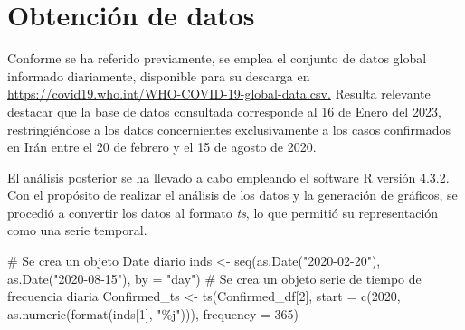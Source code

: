\documentclass[
  letterpaper,
  DIV=11,
  numbers=noendperiod]{scrreport}
\newenvironment{Shaded}{\begin{snugshade}}{\end{snugshade}}
\newcommand{\AttributeTok}[1]{\textcolor[rgb]{0.40,0.45,0.13}{#1}}
\newcommand{\CommentTok}[1]{\textcolor[rgb]{0.37,0.37,0.37}{#1}}
\newcommand{\DecValTok}[1]{\textcolor[rgb]{0.68,0.00,0.00}{#1}}
\newcommand{\FunctionTok}[1]{\textcolor[rgb]{0.28,0.35,0.67}{#1}}
\newcommand{\NormalTok}[1]{\textcolor[rgb]{0.00,0.23,0.31}{#1}}
\newcommand{\OtherTok}[1]{\textcolor[rgb]{0.00,0.23,0.31}{#1}}
\newcommand{\StringTok}[1]{\textcolor[rgb]{0.13,0.47,0.30}{#1}}
\theoremstyle{plain}
\theoremstyle{definition}
\theoremstyle{definition}
\theoremstyle{plain}
\theoremstyle{remark}
\begin{document}
\section{Obtención de datos}\label{obtenciuxf3n-de-datos}

Conforme se ha referido previamente, se emplea el conjunto de datos
global informado diariamente, disponible para su descarga en
\url{https://covid19.who.int/WHO-COVID-19-global-data.csv.} Resulta
relevante destacar que la base de datos consultada corresponde al 16 de
Enero del 2023, restringiéndose a los datos concernientes exclusivamente
a los casos confirmados en Irán entre el 20 de febrero y el 15 de agosto
de 2020.

El análisis posterior se ha llevado a cabo empleando el software R
versión 4.3.2. Con el propósito de realizar el análisis de los datos y
la generación de gráficos, se procedió a convertir los datos al formato
\emph{ts}, lo que permitió su representación como una serie temporal.

\begin{Shaded}
\begin{Highlighting}[]
\CommentTok{\# Se crea un objeto \textquotesingle{}Date\textquotesingle{} diario}
\NormalTok{inds }\OtherTok{\textless{}{-}} \FunctionTok{seq}\NormalTok{(}\FunctionTok{as.Date}\NormalTok{(}\StringTok{"2020{-}02{-}20"}\NormalTok{), }\FunctionTok{as.Date}\NormalTok{(}\StringTok{"2020{-}08{-}15"}\NormalTok{), }\AttributeTok{by =} \StringTok{"day"}\NormalTok{)}
\CommentTok{\# Se crea un objeto \textquotesingle{}serie de tiempo\textquotesingle{} de frecuencia diaria}
\NormalTok{Confirmed\_ts }\OtherTok{\textless{}{-}} \FunctionTok{ts}\NormalTok{(Confirmed\_df[}\DecValTok{2}\NormalTok{], }
                   \AttributeTok{start =} \FunctionTok{c}\NormalTok{(}\DecValTok{2020}\NormalTok{, }\FunctionTok{as.numeric}\NormalTok{(}\FunctionTok{format}\NormalTok{(inds[}\DecValTok{1}\NormalTok{], }\StringTok{"\%j"}\NormalTok{))),}
                   \AttributeTok{frequency =} \DecValTok{365}\NormalTok{)}
\end{Highlighting}
\end{Shaded}
\end{document}
